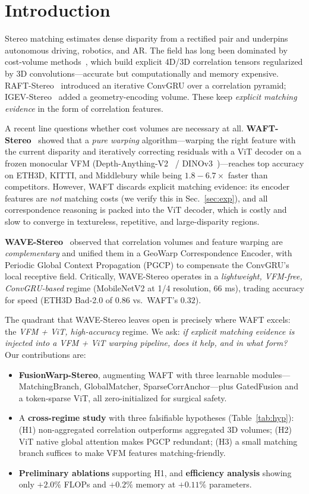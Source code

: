 \documentclass[conference]{IEEEtran}
\begin{document}
\section{Introduction}
Stereo matching estimates dense disparity from a rectified pair and underpins autonomous driving, robotics, and AR. The field has long been dominated by cost-volume methods~\cite{psmnet,gwcnet,acvnet,igev}, which build explicit 4D/3D correlation tensors regularized by 3D convolutions---accurate but computationally and memory expensive. RAFT-Stereo~\cite{raftstereo} introduced an iterative ConvGRU over a correlation pyramid; IGEV-Stereo~\cite{igev} added a geometry-encoding volume. These keep \emph{explicit matching evidence} in the form of correlation features.

A recent line questions whether cost volumes are necessary at all. \textbf{WAFT-Stereo}~\cite{waft} showed that a \emph{pure warping} algorithm---warping the right feature with the current disparity and iteratively correcting residuals with a ViT decoder on a frozen monocular VFM (Depth-Anything-V2~\cite{dav2} / DINOv3~\cite{dinov3})---reaches top accuracy on ETH3D, KITTI, and Middlebury while being $1.8{-}6.7\times$ faster than competitors. However, WAFT discards explicit matching evidence: its encoder features are \emph{not} matching costs (we verify this in Sec.~\ref{sec:exp}), and all correspondence reasoning is packed into the ViT decoder, which is costly and slow to converge in textureless, repetitive, and large-disparity regions.

\textbf{WAVE-Stereo}~\cite{wave} observed that correlation volumes and feature warping are \emph{complementary} and unified them in a GeoWarp Correspondence Encoder, with Periodic Global Context Propagation (PGCP) to compensate the ConvGRU's local receptive field. Critically, WAVE-Stereo operates in a \emph{lightweight, VFM-free, ConvGRU-based} regime (MobileNetV2 at 1/4 resolution, 66 ms), trading accuracy for speed (ETH3D Bad-2.0 of $0.86$ vs.\ WAFT's $0.32$).

The quadrant that WAVE-Stereo leaves open is precisely where WAFT excels: the \emph{VFM + ViT, high-accuracy} regime. We ask: \emph{if explicit matching evidence is injected into a VFM + ViT warping pipeline, does it help, and in what form?} Our contributions are:

\begin{itemize}
\item \textbf{FusionWarp-Stereo}, augmenting WAFT with three learnable modules---MatchingBranch, GlobalMatcher, SparseCorrAnchor---plus GatedFusion and a token-sparse ViT, all zero-initialized for surgical safety.
\item A \textbf{cross-regime study} with three falsifiable hypotheses (Table~\ref{tab:hyp}): (H1) non-aggregated correlation outperforms aggregated 3D volumes; (H2) ViT native global attention makes PGCP redundant; (H3) a small matching branch suffices to make VFM features matching-friendly.
\item \textbf{Preliminary ablations} supporting H1, and \textbf{efficiency analysis} showing only $+2.0\%$ FLOPs and $+0.2\%$ memory at $+0.11\%$ parameters.
\end{itemize}
\end{document}
